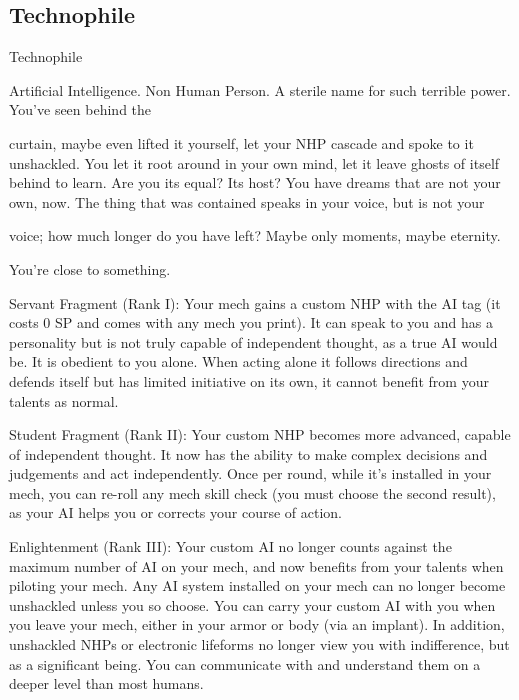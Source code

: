 \subsection{Technophile}

                                                  Technophile    

Artificial Intelligence. Non Human Person. A sterile name for such terrible power. You’ve seen behind the  

curtain, maybe even lifted it yourself, let your NHP cascade and spoke to it unshackled. You let it root  
around in your own mind, let it leave ghosts of itself behind to learn. Are you its equal? Its host? You have  
dreams that are not your own, now. The thing that was contained speaks in your voice, but is not your  

voice; how much longer do you have left? Maybe only moments, maybe eternity.  

You’re close to something.    

Servant Fragment (Rank I): Your mech gains a custom NHP with the AI tag (it costs 0 SP and  
comes with any mech you print). It can speak to you and has a personality but is not truly  
capable of independent thought, as a true AI would be. It is obedient to you alone. When acting  
alone it follows directions and defends itself but has limited initiative on its own, it cannot benefit  
from your talents as normal.
 
Student Fragment (Rank II): Your custom NHP becomes more advanced, capable of  
independent thought. It now has the ability to make complex decisions and judgements and act  
independently. Once per round, while it’s installed in your mech, you can re-roll any mech skill  
check (you must choose the second result), as your AI helps you or corrects your course of  
action.
 
Enlightenment (Rank III): Your custom AI no longer counts against the maximum number of AI  
on your mech, and now benefits from your talents when piloting your mech. Any AI system  
installed on your mech can no longer become unshackled unless you so choose. You can carry  
your custom AI with you when you leave your mech, either in your armor or body (via an implant).  
In addition, unshackled NHPs or electronic lifeforms no longer view you with indifference, but as  
a significant being. You can communicate with and understand them on a deeper level than most  
humans. 